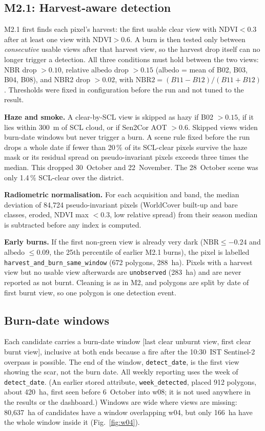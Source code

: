 \documentclass[conference]{IEEEtran}
\begin{document}
\subsection{M2.1: Harvest-aware detection}
M2.1 first finds each pixel's harvest: the first usable clear view with $\mathrm{NDVI}<0.3$ after at
least one view with $\mathrm{NDVI}>0.6$. A burn is then tested only between \emph{consecutive}
usable views after that harvest view, so the harvest drop itself can no longer trigger a
detection. All three conditions must hold between the two views: NBR drop $>0.10$, relative albedo
drop $>0.15$ (albedo = mean of B02, B03, B04, B08), and NBR2 drop $>0.02$, with
$\mathrm{NBR2}=(B11-B12)/(B11+B12)$. Thresholds were fixed in configuration before the run and not
tuned to the result.

\textbf{Haze and smoke.} A clear-by-SCL view is skipped as hazy if B02 $>0.15$, if it lies within
300~m of SCL cloud, or if Sen2Cor AOT $>0.6$. Skipped views widen burn-date windows but never
trigger a burn. A scene rule fixed before the run drops a whole date if fewer than 20\,\% of its
SCL-clear pixels survive the haze mask or its residual spread on pseudo-invariant pixels exceeds
three times the median. This dropped 30~October and 22~November. The 28~October scene was only
1.4\,\% SCL-clear over the district.

\textbf{Radiometric normalisation.} For each acquisition and band, the median deviation of
84{,}724 pseudo-invariant pixels (WorldCover built-up and bare classes, eroded, NDVI max
$<0.3$, low relative spread) from their season median is subtracted before any index is computed.

\textbf{Early burns.} If the first non-green view is already very dark
($\mathrm{NBR}\le-0.24$ and albedo $\le0.09$, the 25th percentile of earlier M2.1 burns), the pixel
is labelled \texttt{harvest\_and\_burn\_same\_window} (672 polygons, 288~ha). Pixels with a harvest
view but no usable view afterwards are \texttt{unobserved} (283~ha) and are never reported as not
burnt. Cleaning is as in M2, and polygons are split by date of first burnt view, so one polygon is
one detection event.

\subsection{Burn-date windows}
Each candidate carries a burn-date window [last clear unburnt view, first clear burnt view],
inclusive at both ends because a fire after the 10:30~IST Sentinel-2 overpass is possible. The end
of the window, \texttt{detect\_date}, is the first view showing the scar, not the burn date. All
weekly reporting uses the week of \texttt{detect\_date}. (An earlier stored attribute,
\texttt{week\_detected}, placed 912 polygons, about 420~ha, first seen before 6~October into w08;
it is not used anywhere in the results or the dashboard.) Windows are wide where views are
missing: 80{,}637~ha of candidates have a window overlapping w04, but only 166~ha have the whole
window inside it (Fig.~\ref{fig:w04}).
\end{document}
